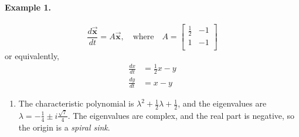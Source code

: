 \documentclass[reqno]{immbook}
\newcommand{\BX}{\vec{\textbf{x}}}
\begin{document}
\paragraph{Example 1.}
\[
  \frac{d\BX}{dt} = A \BX, \quad \textrm{where} \quad
    A = \begin{bmatrix}
                   \frac{1}{2} & -1 \\
		   1 & -1 \\
        \end{bmatrix}
\]
or equivalently,
\[
\begin{split}
   \frac{dx}{dt} & = \frac{1}{2} x - y \\
   \frac{dy}{dt} & = x - y
\end{split}
\]
\begin{enumerate}
\item
The characteristic polynomial is $\lambda^2 +\frac{1}{2}\lambda+\frac{1}{2}$,
and the eigenvalues are
$\lambda = -\frac{1}{4}\pm i \frac{\sqrt{7}}{4}$.
The eigenvalues are complex,
and the real part is negative,
so the origin is a \emph{spiral sink}.


\end{enumerate}
\end{document}
